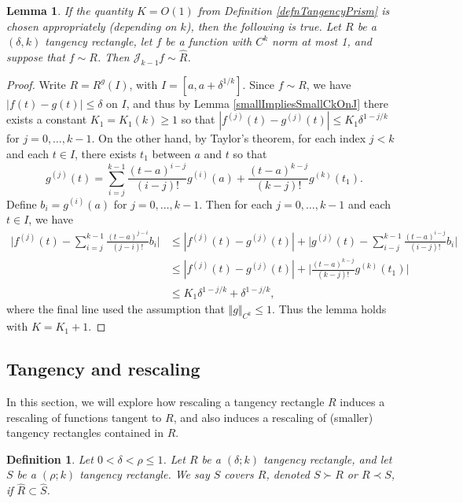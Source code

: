 \documentclass[letterpaper, reqno,11pt]{article}
\numberwithin{equation}{section}
\numberwithin{thm}{section}
\newtheorem{defn}[thm]{Definition}
\newtheorem{lem}[thm]{Lemma}
\theoremstyle{remark}
\begin{document}
\begin{lem}\label{tangencyPrismVsRect}
If the quantity $K=O(1)$ from Definition \ref{defnTangencyPrism} is chosen appropriately (depending on $k$), then the following is true. Let $R$ be a $(\delta,k)$ tangency rectangle, let $f$ be a function with $C^k$ norm at most 1, and suppose that $f\sim R$. Then $\mathcal{J}_{k-1}f\sim \hat R$.
\end{lem}
\begin{proof}
Write $R=R^g(I)$, with $I = [a, a+\delta^{1/k}]$. Since $f\sim R$, we have $|f(t)-g(t)|\leq\delta$ on $I$, and thus by Lemma \ref{smallImpliesSmallCkOnJ} there exists a constant $K_1=K_1(k)\geq 1$ so that $|f^{(j)}(t)-g^{(j)}(t)|\leq K_1 \delta^{1-j/k}$ for $j=0,\ldots,k-1$. On the other hand, by Taylor's theorem, for each index $j< k$ and each $t\in I$, there exists $t_1$ between $a$ and $t$ so that
\[
g^{(j)}(t) = \sum_{i=j}^{k-1} \frac{(t-a)^{i-j}}{(i-j)!} g^{(i)}(a) + \frac{(t-a)^{k-j}}{(k-j)!}g^{(k)}(t_1).
\]
Define $b_i= g^{(i)}(a)$ for $j=0,\ldots,k-1$. Then for each $j=0,\ldots,k-1$ and each $t\in I$, we have
\begin{equation}
\begin{split}
\Big| f^{(j)}(t) - \sum_{i=j}^{k-1}\frac{(t-a)^{j-i}}{(j-i)!}b_i\Big| & \leq |f^{(j)}(t)-g^{(j)}(t)| + \Big| g^{(j)}(t) - \sum_{i-j}^{k-1}\frac{(t-a)^{i-j}}{(i-j)!} b_i\Big|\\
& \leq |f^{(j)}(t)-g^{(j)}(t)| + \Big| \frac{(t-a)^{k-j}}{(k-j)!}g^{(k)}(t_1)\Big|\\
&\leq K_1 \delta^{1-j/k} + \delta^{1-j/k},
\end{split}
\end{equation}
where the final line used the assumption that $\Vert g \Vert_{C^k}\leq 1$. Thus the lemma holds with $K=K_1+1$.
\end{proof}



\subsection{Tangency and rescaling}
In this section, we will explore how rescaling a tangency rectangle $R$ induces a rescaling of functions tangent to $R$, and also induces a rescaling of (smaller) tangency rectangles contained in $R$.

\begin{defn}\label{rectangleCoveringDefn}
Let $0<\delta<\rho\leq 1$. Let $R$ be a $(\delta;k)$ tangency rectangle, and let $S$ be a $(\rho;k)$ tangency rectangle. We say $S$ \emph{covers} $R$, denoted $S\succ R$ or $R\prec S$, if $\hat{R}\subset \hat S$.
\end{defn}
\end{document}
